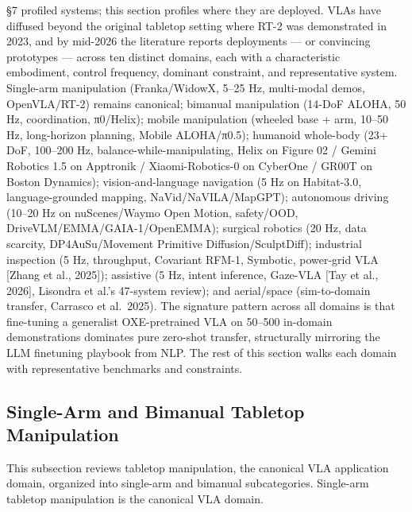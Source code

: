 §7 profiled systems; this section profiles where they are deployed. VLAs have diffused beyond the original tabletop setting where RT-2 was demonstrated in 2023, and by mid-2026 the literature reports deployments --- or convincing prototypes --- across ten distinct domains, each with a characteristic embodiment, control frequency, dominant constraint, and representative system. Single-arm manipulation (Franka/WidowX, 5--25 Hz, multi-modal demos, OpenVLA/RT-2) remains canonical; bimanual manipulation (14-DoF ALOHA, 50 Hz, coordination, π0/Helix); mobile manipulation (wheeled base + arm, 10--50 Hz, long-horizon planning, Mobile ALOHA/π0.5); humanoid whole-body (23+ DoF, 100--200 Hz, balance-while-manipulating, Helix on Figure 02 / Gemini Robotics 1.5 on Apptronik / Xiaomi-Robotics-0 on CyberOne / GR00T on Boston Dynamics); vision-and-language navigation (5 Hz on Habitat-3.0, language-grounded mapping, NaVid/NaVILA/MapGPT); autonomous driving (10--20 Hz on nuScenes/Waymo Open Motion, safety/OOD, DriveVLM/EMMA/GAIA-1/OpenEMMA); surgical robotics (20 Hz, data scarcity, DP4AuSu/Movement Primitive Diffusion/SculptDiff); industrial inspection (5 Hz, throughput, Covariant RFM-1, Symbotic, power-grid VLA {[}Zhang et al., 2025{]}); assistive (5 Hz, intent inference, Gaze-VLA {[}Tay et al., 2026{]}, Lisondra et al.'s 47-system review); and aerial/space (sim-to-domain transfer, Carrasco et al.~2025). The signature pattern across all domains is that fine-tuning a generalist OXE-pretrained VLA on 50--500 in-domain demonstrations dominates pure zero-shot transfer, structurally mirroring the LLM finetuning playbook from NLP. The rest of this section walks each domain with representative benchmarks and constraints.

\subsection{Single-Arm and Bimanual Tabletop Manipulation}\label{single-arm-and-bimanual-tabletop-manipulation}

This subsection reviews tabletop manipulation, the canonical VLA application domain, organized into single-arm and bimanual subcategories. Single-arm tabletop manipulation is the canonical VLA domain.

